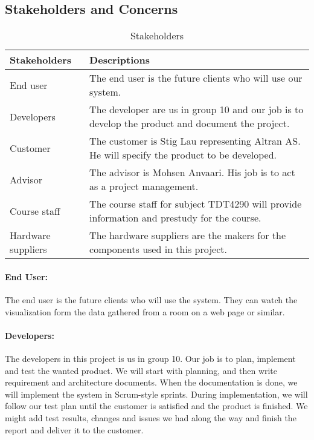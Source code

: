 \documentclass[../document.tex]{subfiles}
\begin{document}
\subsection{Stakeholders and Concerns}
\begin{table}[H]
	\caption{Stakeholders}
	\begin{tabularx}{\textwidth}{|X|X|}
		\hline
		\textbf{Stakeholders}	& \textbf{Descriptions} \\ \hline
		End user				& The end user is the future clients who will use our system.  \\ \hline
		Developers				& The developer are us in group 10 and our job is to develop the product and document the project.  \\ \hline
		Customer				& The customer is Stig Lau representing Altran AS. He will specify the product to be developed.  \\ \hline
		Advisor					& The advisor is Mohsen Anvaari. His job is to act as a project management.  \\ \hline
		Course staff			& The course staff for subject TDT4290 will provide information and prestudy for the course.  \\ \hline
		Hardware suppliers		& The hardware suppliers are the makers for the components used in this project.  \\ \hline
	\end{tabularx}
\end{table}

\paragraph{End User:} The end user is the future clients who will use the system. They can watch the visualization form the data gathered from a room on a web page or similar. 

\paragraph{Developers:} The developers in this project is us in group 10. Our job is to plan, implement and test the wanted product. We will start with planning, and then write requirement and architecture documents. When the documentation is done, we will implement the system in Scrum-style sprints. During implementation, we will follow our test plan until the customer is satisfied and the product is finished. We might add test results, changes and issues we had along the way and finish the report and deliver it to the customer.
\end{document}
